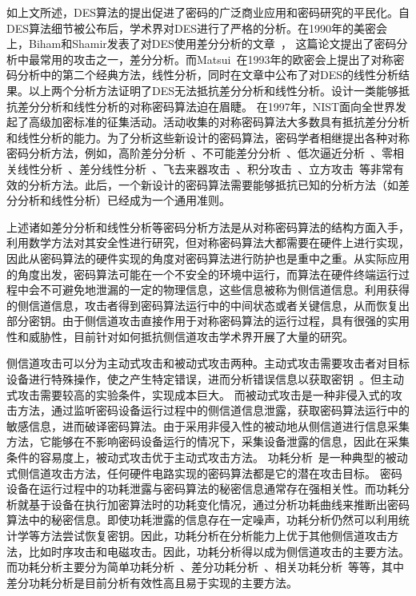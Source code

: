 \documentclass[a4paper,zihao=-4,AutoFakeBold]{ctexart}
\begin{document}
如上文所述，DES算法的提出促进了密码的广泛商业应用和密码研究的平民化。自DES算法细节被公布后，学术界对DES进行了严格的分析。在1990年的美密会上，Biham和Shamir发表了对DES使用差分分析的文章~\cite{BihamSCRYPTO90}， 这篇论文提出了密码分析中最常用的攻击之一，差分分析。而Matsui~\cite{M94}在1993年的欧密会上提出了对称密码分析中的第二个经典方法，线性分析，同时在文章中公布了对DES的线性分析结果。以上两个分析方法证明了DES无法抵抗差分分析和线性分析。设计一类能够抵抗差分分析和线性分析的对称密码算法迫在眉睫。
在1997年，NIST面向全世界发起了高级加密标准的征集活动。活动收集的对称密码算法大多数具有抵抗差分分析和线性分析的能力。为了分析这些新设计的密码算法，密码学者相继提出各种对称密码分析方法，例如，高阶差分分析~\cite{LRK95}、不可能差分分析~\cite{BihamBS99}、低次逼近分析~\cite{GJloworderapproximation,KR96}、零相关线性分析~\cite{SunLGRL16}、差分线性分析~\cite{DLCTLi2019}、飞去来器攻击~\cite{BoomerangAttack99}、积分攻击~\cite{IntegralCryptanalysis02}、立方攻击~\cite{DinurSCube09}等非常有效的分析方法。此后，一个新设计的密码算法需要能够抵抗已知的分析方法（如差分分析和线性分析）已经成为一个通用准则。

上述诸如差分分析和线性分析等密码分析方法是从对称密码算法的结构方面入手，利用数学方法对其安全性进行研究，但对称密码算法大都需要在硬件上进行实现，因此从密码算法的硬件实现的角度对密码算法进行防护也是重中之重。从实际应用的角度出发，密码算法可能在一个不安全的环境中运行，而算法在硬件终端运行过程中会不可避免地泄漏的一定的物理信息，这些信息被称为侧信道信息。利用获得的侧信道信息，攻击者得到密码算法运行中的中间状态或者关键信息，从而恢复出部分密钥。由于侧信道攻击直接作用于对称密码算法的运行过程，具有很强的实用性和威胁性，目前针对如何抵抗侧信道攻击学术界开展了大量的研究。

侧信道攻击可以分为主动式攻击和被动式攻击两种。主动式攻击需要攻击者对目标设备进行特殊操作，使之产生特定错误，进而分析错误信息以获取密钥~\cite{FaultAttack97}。但主动式攻击需要较高的实验条件，实现成本巨大。
而被动式攻击是一种非侵入式的攻击方法，通过监听密码设备运行过程中的侧信道信息泄露，获取密码算法运行中的敏感信息，进而破译密码算法。由于采用非侵入性的被动地从侧信道进行信息采集方法，它能够在不影响密码设备运行的情况下，采集设备泄露的信息，因此在采集条件的容易度上，被动式攻击优于主动式攻击方法。
功耗分析~\cite{KocherDPA99}是一种典型的被动式侧信道攻击方法，任何硬件电路实现的密码算法都是它的潜在攻击目标。
密码设备在运行过程中的功耗泄露与密码算法的秘密信息通常存在强相关性。而功耗分析就基于设备在执行加密算法时的功耗变化情况，通过分析功耗曲线来推断出密码算法中的秘密信息。即使功耗泄露的信息存在一定噪声，功耗分析仍然可以利用统计学等方法尝试恢复密钥。因此，功耗分析在分析能力上优于其他侧信道攻击方法，比如时序攻击和电磁攻击。因此，功耗分析得以成为侧信道攻击的主要方法。而功耗分析主要分为简单功耗分析~\cite{KocherDPA99}、差分功耗分析~\cite{KocherDPA99}、相关功耗分析~\cite{CPA04}等等，其中差分功耗分析是目前分析有效性高且易于实现的主要方法。
\end{document}
